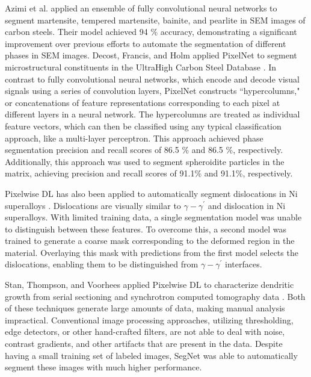 \documentclass[pdflatex,sn-mathphys]{sn-jnl}%
\theoremstyle{thmstyleone}%
\theoremstyle{thmstyletwo}%
\theoremstyle{thmstylethree}%
\begin{document}
Azimi et al. applied an ensemble of fully convolutional neural networks to segment martensite, tempered martensite, bainite, and pearlite in SEM images of carbon steels.  Their model achieved 94 \% accuracy, demonstrating a significant improvement over previous efforts to automate the segmentation of different phases in SEM images. Decost, Francis, and Holm applied PixelNet to segment microstructural constituents in the UltraHigh Carbon Steel Database \cite{decost_hecht_francis_webler_picard_holm_2017, decost_lei_francis_holm_2019}. In contrast to fully convolutional neural networks, which encode and decode visual signals using a series of convolution layers, PixelNet constructs ``hypercolumns," or concatenations of feature representations corresponding to each pixel at different layers in a neural network. The hypercolumns are treated as individual feature vectors, which can then be classified using any typical classification approach, like a multi-layer perceptron.  This approach achieved phase segmentation precision and recall scores of 86.5 \% and 86.5 \%, respectively. Additionally, this approach was used to segment spheroidite particles in the matrix, achieving precision and recall scores of 91.1\% and 91.1\%, respectively. 

Pixelwise DL has also been applied to automatically segment dislocations in Ni superalloys \cite{Holm2020overview}. Dislocations are visually similar to $\gamma - \gamma^\prime$ and dislocation in Ni superalloys. With limited training data, a single segmentation model was unable to distinguish between these features. To overcome this, a second model was trained to generate a coarse mask corresponding to the deformed region in the material. Overlaying this mask with predictions from the first model selects the dislocations, enabling them to be distinguished from $\gamma - \gamma^\prime$ interfaces.

Stan, Thompson, and Voorhees applied Pixelwise DL to characterize dendritic growth from serial sectioning and synchrotron computed tomography data 
\cite{stan2020optimizing}.  Both of these techniques generate large amounts of data, making manual analysis impractical.  Conventional image processing approaches, utilizing thresholding, edge detectors, or other hand-crafted filters, are not able to deal with noise, contrast gradients, and other artifacts that are present in the data. Despite having a small training set of labeled images, SegNet was able to automatically segment these images with much higher performance. 
\end{document}
